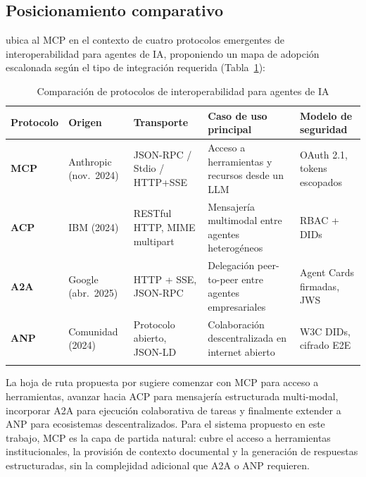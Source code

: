 \subsection{Posicionamiento comparativo}

\citet{ehtesham2025survey} ubica al MCP en el contexto de cuatro protocolos emergentes de interoperabilidad para agentes de IA, proponiendo un mapa de adopción escalonada según el tipo de integración requerida (Tabla~\ref{tab:protocolos_agentes}):

\begin{table}[htb]
\centering
\small
\setlength{\extrarowheight}{3pt}
\caption{Comparación de protocolos de interoperabilidad para agentes de IA \citep{ehtesham2025survey}}
\label{tab:protocolos_agentes}
\begin{tabularx}{\textwidth}{p{1.8cm} p{1.6cm} p{2.0cm} X p{2.2cm}}
\toprule
\textbf{Protocolo} & \textbf{Origen} & \textbf{Transporte} & \textbf{Caso de uso principal} & \textbf{Modelo de seguridad} \\
\midrule
\textbf{MCP}
  & Anthropic (nov.\ 2024)
  & JSON-RPC / Stdio / HTTP+SSE
  & Acceso a herramientas y recursos desde un LLM
  & OAuth 2.1, tokens escopados \\
\arrayrulecolor{gray!35}\hline
\textbf{ACP}
  & IBM (2024)
  & RESTful HTTP, MIME multipart
  & Mensajería multimodal entre agentes heterogéneos
  & RBAC + DIDs \\
\hline
\textbf{A2A}
  & Google (abr.\ 2025)
  & HTTP + SSE, JSON-RPC
  & Delegación peer-to-peer entre agentes empresariales
  & Agent Cards firmadas, JWS \\
\hline
\textbf{ANP}
  & Comunidad (2024)
  & Protocolo abierto, JSON-LD
  & Colaboración descentralizada en internet abierto
  & W3C DIDs, cifrado E2E \\
\arrayrulecolor{black}\bottomrule
\end{tabularx}
\end{table}

La hoja de ruta propuesta por \citet{ehtesham2025survey} sugiere comenzar con MCP para acceso a herramientas, avanzar hacia ACP para mensajería estructurada multi-modal, incorporar A2A para ejecución colaborativa de tareas y finalmente extender a ANP para ecosistemas descentralizados. Para el sistema propuesto en este trabajo, MCP es la capa de partida natural: cubre el acceso a herramientas institucionales, la provisión de contexto documental y la generación de respuestas estructuradas, sin la complejidad adicional que A2A o ANP requieren.

